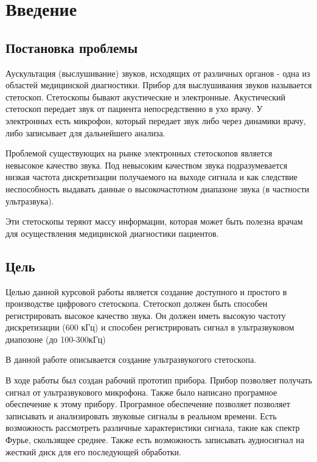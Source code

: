\documentclass[14pt]{extarticle}
\begin{document}
\begin{titlepage}

\end{titlepage}

\tableofcontents
\newpage 
\section{Введение}
\subsection{Постановка проблемы}
Аускультация (выслушивание) звуков, исходящих от различных органов - одна из областей медицинской диагностики. Прибор для выслушивания звуков называется стетоскоп. Стетоскопы бывают акустические и электронные. Акустический стетоскоп передает звук от пациента непосредственно в ухо врачу. У электронных есть микрофон, который передает звук либо через динамики врачу, либо записывает для дальнейшего анализа.

Проблемой существующих на рынке электронных стетоскопов является невысокое качество звука. Под невысоким качеством звука подразумевается низкая частота дискретизации получаемого на выходе сигнала и как следствие неспособность выдавать данные о высокочастотном диапазоне звука (в частности ультразвука).

Эти стетоскопы теряют массу информации, которая может быть полезна врачам для осуществления медицинской диагностики пациентов.

\subsection{Цель}
Целью данной курсовой работы является создание доступного и простого в производстве цифрового стетоскопа. Стетоскоп должен быть способен регистрировать высокое качество звука. Он должен иметь высокую частоту дискретизации (600 кГц) и способен регистрировать сигнал в ультразвуковом диапозоне (до 100-300кГц)

В данной работе описывается создание ультразвукогого стетоскопа.

В ходе работы был создан рабочий прототип прибора. Прибор позволяет получать сигнал от ультразвукового микрофона. Также было написано програмное обеспечение к этому прибору. Програмное обеспечение позволяет позволяет записывать и анализировать звуковые сигналы в реальном времени. Есть возможность рассмотреть различные характеристики сигнала, такие как спектр Фурье, скользящее среднее. Также есть возможность записывать аудиосигнал на жесткий диск для его последующей обработки.
\end{document}
